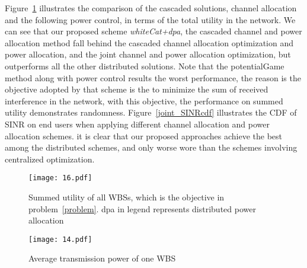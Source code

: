 Figure~\ref{CAPA_utility} illustrates the comparison of the cascaded solutions, \ie channel allocation and the following power control, in terms of the total utility in the network.
We can see that our proposed scheme \textit{whiteCat+dpa}, the cascaded channel and power allocation method fall behind the cascaded channel allocation optimization and power allocation, and the joint channel and power allocation optimization, but outperforms all the other distributed solutions.
Note that the potentialGame method along with power control results the worst performance, the reason is the objective adopted by that scheme is the to minimize the sum of received interference in the network, with this objective, the performance on summed utility demonstrates randomness.
Figure~\ref{joint_SINRcdf} illustrates the CDF of SINR on end users when applying different channel allocation and power allocation schemes.
it is clear that our proposed approaches achieve the best among the distributed schemes, and only worse wore than the schemes involving centralized optimization.



\begin{figure}[h!]
  \centering
  \texttt{[image: 16.pdf]}
  \caption{Summed utility of all WBSs, which is the objective in problem~\ref{problem}. dpa in legend represents distributed power allocation}
\label{CAPA_utility}
\end{figure}





\begin{figure}[h!]
  \centering
  \texttt{[image: 14.pdf]}
  \caption{Average transmission power of one WBS}
\label{CAPA_power}
\end{figure}
%
%


